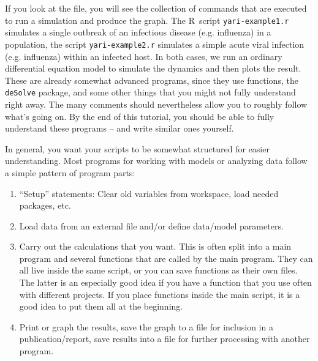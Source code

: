 \documentclass [11pt]{article}
\newcommand{\code}[1]{{\tt #1}}
\newcommand\R{{\sf R}}
\numberwithin{exercise}{section}
\begin{document}
If you look at the file, you will see the collection of commands that are executed to run a simulation and produce the graph. The \R\ script
\code{yari-example1.r} simulates a single outbreak of an infectious disease (e.g. influenza) in a population, the script \code{yari-example2.r} simulates a simple acute viral infection (e.g. influenza) within an infected host. In both cases, we run an ordinary differential equation model to simulate the dynamics and then plots the result. These are already somewhat advanced programs, since they use functions, the \code{deSolve} package, and some other things that you might not fully understand right away. The many comments should nevertheless allow you to roughly follow what's going on. By the end of this tutorial, you should be able to fully understand these programs -- and write similar ones yourself.

In general, you want your scripts to be somewhat structured for easier understanding. Most programs for working with models or analyzing data follow a simple pattern of program parts:
\begin{enumerate}
\item ``Setup'' statements: Clear old variables from workspace, load needed packages, etc.
\item Load data from an external file and/or define data/model parameters.
\item Carry out the calculations that you want. This is often split into a main program and several functions that are called by the main program. They can all live inside the same script, or you can save functions as their own files. The latter is an especially good idea if you have a function that you use often with different projects. If you place functions inside the main script, it is a good idea to put them all at the beginning.
\item Print or graph the results, save the graph to a file for inclusion in a publication/report, save results into a file for further processing with another program. 
\end{enumerate}

\end{document}

